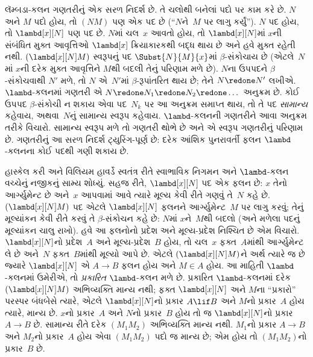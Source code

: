 \documentclass[../../../include/open-logic-section]{subfiles}
\begin{document}


લૅમ્બડા-કલન ગણતરીનું એક સરળ નિદર્શ છે. તે
ચલોથી બનેલાં પદો પર કામ કરે છે. $N$ અને $M$
પદો હોય, તો $(NM)$ પણ એક પદ છે
(``$N$ને~$M$ પર લાગુ કર્યું''). $N$ પદ
હોય, તો $\lambd[x][N]$ પણ પદ છે. $N$માં
ચલ~$x$ આવતો હોય, તો $\lambd[x][N]$માં
$x$ની સંબંધિત મુક્ત આવૃત્તિઓ $\lambd[x]$ ક્રિયાકારકથી
બદ્ધ થાય છે અને હવે મુક્ત રહેતી નથી.
$(\lambd[x][N]M)$ સ્વરૂપનું પદ
$\Subst{N}{M}{x}$માં $\beta$-સંકોચાય છે
(એટલે~$N$માં $x$ની દરેક મુક્ત આવૃત્તિને
$M$થી બદલી તેનું પરિણામ મળે છે).
$N$ના ઉપપદને $\beta$-સંકોચવાથી $N'$
મળે, તો $N$ એ~$N'$માં $\beta$-રૂપાંતરિત
થાય છે; તેને $N \redone N'$ લખીએ.
$\lambd$-કલનમાં ગણતરી એ
$N \redone N_1 \redone N_2 \redone \dots$
અનુક્રમ છે. કોઈ ઉપપદ $\beta$-સંકોચી ન
શકાય એવા પદ~$N_k$ પર આ અનુક્રમ સમાપ્ત
થાય, તો તે પદ \emph{સામાન્ય} કહેવાય,
અથવા~$N$નું સામાન્ય સ્વરૂપ કહેવાય. $\lambd$-કલનની
ગણતરીને આવા અનુક્રમ તરીકે વિચારો. સામાન્ય
સ્વરૂપ મળે તો ગણતરી થોભે છે અને એ સ્વરૂપ
ગણતરીનું પરિણામ છે. ગણતરીનું આ સરળ
નિદર્શ ટ્યુરિંગ-પૂર્ણ છે: દરેક આંશિક પુનરાવર્તી
ફલન $\lambd$-કલનના કોઈ પદથી ગણી શકાય છે.

હાસ્કેલ કરી અને વિલિયમ હાવર્ડે સ્વતંત્ર રીતે
સ્વાભાવિક નિગમન અને $\lambd$-કલન વચ્ચેનું
નજીકનું સામ્ય શોધ્યું. સહજ રીતે,
$\lambd[x][N]$ પદ એક ફલન છે: $x$ તેનો
આર્ગ્યુમેન્ટ છે અને~$x$ આપવામાં આવે ત્યારે
મૂલ્ય કેવી રીતે ગણવું તે~$N$ કહે છે.
$(\lambd[x][N]M)$ પદ એટલે
$\lambd[x][N]$ ફલનને આર્ગ્યુમેન્ટ~$M$
પર લાગુ કરવું; તેનું મૂલ્યાંકન કેવી રીતે કરવું
તે $\beta$-સંકોચન કહે છે: $N$માં $x$ને~$M$થી
બદલો (અને મળેલા પદનું મૂલ્યાંકન ચાલુ રાખો).
હવે આ ફલનોનો પ્રદેશ અને મૂલ્ય-પ્રદેશ
નિશ્ચિત છે એમ વિચારો. $\lambd[x][N]$નો
પ્રદેશ~$A$ અને મૂલ્ય-પ્રદેશ~$B$ હોય, તો
ચલ~$x$ ફક્ત~$A$માંથી આર્ગ્યુમેન્ટ લે છે
અને~$N$ ફક્ત~$B$માંથી મૂલ્યો આપે છે.
એટલે $(\lambd[x][N]M)$ને અર્થ ત્યારે જ
છે જ્યારે $\lambd[x][N]$ એ $A \to B$
ફલન હોય અને $M \in A$ હોય. આ માહિતી
$\lambd$-કલનમાં ઉમેરીએ, તો
\emph{પ્રકારિત} $\lambd$-કલન મળે છે.
પ્રકારિત $\lambd$-કલનમાં દરેક
$(\lambd[x][N]M)$ અભિવ્યક્તિ માન્ય નથી;
ફક્ત $\lambd[x][N]$ અને $M$ના
``પ્રકારો'' પરસ્પર બંધબેસે ત્યારે, એટલે
$\lambd[x][N]$નો પ્રકાર $A \lif B$
અને $M$નો પ્રકાર~$A$ હોય ત્યારે, માન્ય છે.
$x$નો પ્રકાર~$A$ અને $N$નો પ્રકાર~$B$
હોય તો જ $\lambd[x][N]$નો પ્રકાર
$A \to B$ છે. સામાન્ય રીતે દરેક
$(M_1M_2)$ અભિવ્યક્તિ માન્ય નથી.
$M_1$નો પ્રકાર $A \to B$ અને
$M_2$નો પ્રકાર~$A$ હોય એવા
$(M_1M_2)$ પદો જ માન્ય છે;
એમ હોય તો $(M_1M_2)$નો પ્રકાર~$B$ છે.
\end{document}
